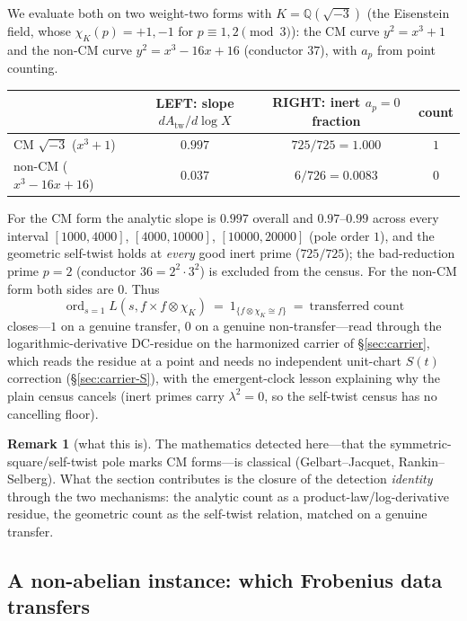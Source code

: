 \documentclass[11pt]{article}
\theoremstyle{definition}
\newtheorem{remark}[theorem]{Remark}
\newcommand{\ord}{\operatorname{ord}}
\begin{document}
We evaluate both on two weight-two forms with $K=\mathbb Q(\sqrt{-3})$ (the Eisenstein field, whose
$\chi_K(p)=+1,-1$ for $p\equiv1,2\pmod3$): the CM curve $y^2=x^3+1$ and the non-CM curve
$y^2=x^3-16x+16$ (conductor $37$), with $a_p$ from point counting.

\begin{center}
\begin{tabular}{lccc}
\toprule
 & LEFT: slope $dA_{\mathrm{tw}}/d\log X$ & RIGHT: inert $a_p=0$ fraction & count \\
\midrule
CM $\sqrt{-3}$ ($x^3+1$) & $0.997$ & $725/725=1.000$ & $1$ \\
non-CM ($x^3-16x+16$) & $0.037$ & $6/726=0.0083$ & $0$ \\
\bottomrule
\end{tabular}
\end{center}

For the CM form the analytic slope is $0.997$ overall and $0.97$--$0.99$ across every interval $[1000,4000]$,
$[4000,10000]$, $[10000,20000]$ (pole order $1$), and the geometric self-twist holds at \emph{every} good
inert prime ($725/725$); the bad-reduction prime $p=2$ (conductor $36=2^2\cdot3^2$) is excluded from the
census. For the non-CM form both sides are $0$. Thus
\[
  \boxed{\ \ord_{s=1}L(s,f\times f\otimes\chi_K)\ =\ 1_{\{f\otimes\chi_K\cong f\}}\ =\ \text{transferred count}\ }
\]
closes---$1$ on a genuine transfer, $0$ on a genuine non-transfer---read through the logarithmic-derivative DC-residue on the harmonized carrier of \S\ref{sec:carrier}, which reads the residue at a point and
needs no independent unit-chart \(S(t)\) correction (\S\ref{sec:carrier-S}), with the emergent-clock
lesson explaining why the plain census cancels (inert primes carry $\lambda^2=0$, so the self-twist
census has no cancelling floor).

\begin{remark}[what this is]
The mathematics detected here---that the symmetric-square/self-twist pole marks CM forms---is
classical (Gelbart--Jacquet, Rankin--Selberg). What the section contributes is the closure of the
detection \emph{identity} through the two mechanisms: the analytic count as a product-law/log-derivative residue, the geometric count as the self-twist relation, matched on a genuine transfer.
\end{remark}

\subsection{A non-abelian instance: which Frobenius data transfers}\label{sec:a4}
\end{document}
